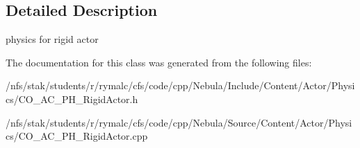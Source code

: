 \subsection{Detailed Description}
physics for rigid actor 

The documentation for this class was generated from the following files:\begin{DoxyCompactItemize}
\item 
/nfs/stak/students/r/rymalc/cfs/code/cpp/Nebula/Include/Content/Actor/Physics/CO\_\-AC\_\-PH\_\-RigidActor.h\item 
/nfs/stak/students/r/rymalc/cfs/code/cpp/Nebula/Source/Content/Actor/Physics/CO\_\-AC\_\-PH\_\-RigidActor.cpp\end{DoxyCompactItemize}
